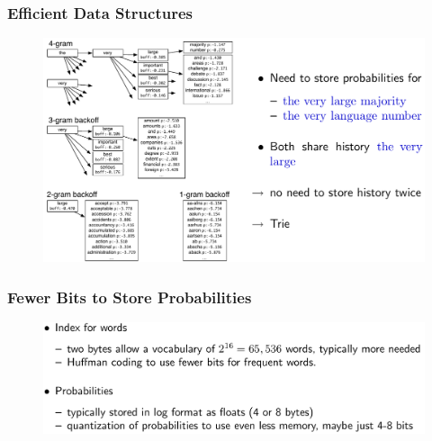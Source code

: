\documentclass{beamer}
\begin{document}
\begin{frame}\frametitle{Efficient Data Structures}
\begin{figure}
\includegraphics[width=1\linewidth]{figure/efficient_data_structure.pdf}
\end{figure}
\end{frame}

\begin{frame}\frametitle{Fewer Bits to Store Probabilities}
\begin{figure}
\includegraphics[width=1\linewidth]{figure/store_probabilities.pdf}
\end{figure}
\end{frame}
\end{document}
